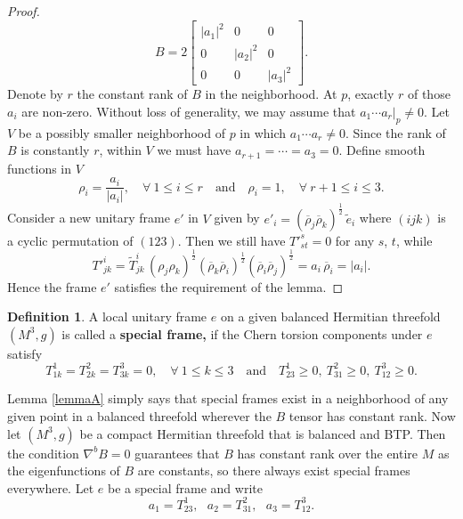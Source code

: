 \documentclass{amsart}
\numberwithin{equation}{section}
\theoremstyle{definition}
\newtheorem{definition}  [theorem]     {Definition}
\renewcommand{\1}{\mathds{1}}
\renewcommand{\>}{\rightarrow}
\begin{document}
\begin{proof}
$$ B = 2 \begin{bmatrix} |a_1|^2 & 0 & 0 \\ 0 & |a_2|^2 & 0 \\ 0 & 0 & |a_3|^2 \end{bmatrix}\!\!.$$
Denote by $r$ the constant rank of $B$ in the neighborhood. At $p$, exactly $r$ of those $a_i$ are non-zero. Without loss of generality, we may assume that $a_1\cdots a_r|_p\neq 0$. Let $V$ be a possibly smaller neighborhood of $p$ in which $a_1\cdots a_r \neq 0$. Since the rank of $B$ is constantly $r$, within $V$ we must have $a_{r+1}=\cdots =a_3=0$.  Define smooth functions in $V$
$$ \rho_i = \frac{a_i}{|a_i|}, \quad  \forall \ 1\leq i\leq r \quad \mbox{and} \quad \rho_i=1 , \quad \forall \ r\!+\!1\leq i\leq 3.  $$
Consider a new unitary frame $e'$ in $V$ given by $e'_i =  (\overline{\rho}_j \overline{\rho}_k)^{\frac{1}{2}} \,\tilde{e}_i$ where $(ijk)$ is a cyclic permutation of $(123)$. Then we still have $T'^s_{st}=0$ for any $s$, $t$, while
$$ T'^i_{jk} = \widetilde{T}^i_{jk} \, (\rho_j\rho_k)^{\frac{1}{2}} (\overline{\rho}_k \overline{\rho}_i )^{\frac{1}{2}}  (\overline{\rho}_i \overline{\rho}_j )^{\frac{1}{2}} = a_i \, \overline{\rho}_i = |a_i|. $$
Hence the frame $e'$ satisfies the requirement of the lemma.
\end{proof}

\begin{definition}
A local unitary frame $e$ on a given balanced Hermitian threefold $(M^3,g)$ is called a {\bf special frame,} if the Chern torsion components under $e$ satisfy
\begin{equation}\label{specialframe}
T^1_{1k}=T^2_{2k}=T^3_{3k}=0, \quad \forall \ 1\leq k\leq 3 \quad \mbox{and} \quad  T^1_{23} \geq 0,\ T^2_{31} \geq 0,\ T^3_{12} \geq 0.
\end{equation}
\end{definition}

Lemma \ref{lemmaA} simply says that special frames exist in a neighborhood  of any given point in a balanced threefold wherever the $B$ tensor has constant rank. Now let $(M^3,g)$ be a compact Hermitian threefold that is balanced and BTP. Then the condition $\nabla^bB=0$ guarantees that $B$ has constant rank over the entire $M$ as the eigenfunctions of $B$ are constants, so there always exist special frames everywhere. Let $e$ be a special frame and write
\begin{equation}
 a_1=T^1_{23}, \ \ \ a_2=T^2_{31}, \ \ \ a_3=T^3_{12}. \label{eq:a}
\end{equation}
\end{document}

